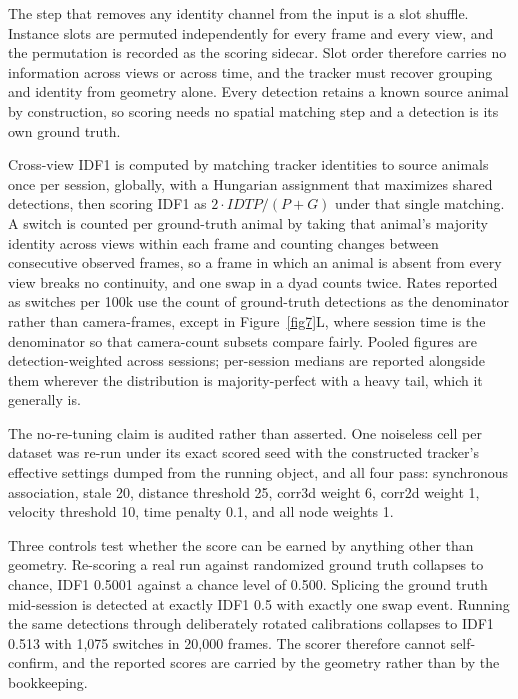 \documentclass[pdflatex, sn-nature]{sn-jnl}
\theoremstyle{thmstyleone}%
\theoremstyle{thmstyletwo}%
\theoremstyle{thmstylethree}%
\begin{document}
The step that removes any identity channel from the input is a slot shuffle. Instance slots are permuted independently for every frame and every view, and the permutation is recorded as the scoring sidecar. Slot order therefore carries no information across views or across time, and the tracker must recover grouping and identity from geometry alone. Every detection retains a known source animal by construction, so scoring needs no spatial matching step and a detection is its own ground truth.

Cross-view IDF1 is computed by matching tracker identities to source animals once per session, globally, with a Hungarian assignment that maximizes shared detections, then scoring IDF1 as $2 \cdot IDTP / (P + G)$ under that single matching. A switch is counted per ground-truth animal by taking that animal's majority identity across views within each frame and counting changes between consecutive observed frames, so a frame in which an animal is absent from every view breaks no continuity, and one swap in a dyad counts twice. Rates reported as switches per 100k use the count of ground-truth detections as the denominator rather than camera-frames, except in Figure~\ref{fig7}L, where session time is the denominator so that camera-count subsets compare fairly. Pooled figures are detection-weighted across sessions; per-session medians are reported alongside them wherever the distribution is majority-perfect with a heavy tail, which it generally is.

The no-re-tuning claim is audited rather than asserted. One noiseless cell per dataset was re-run under its exact scored seed with the constructed tracker's effective settings dumped from the running object, and all four pass: synchronous association, stale 20, distance threshold 25, corr3d weight 6, corr2d weight 1, velocity threshold 10, time penalty 0.1, and all node weights 1.

Three controls test whether the score can be earned by anything other than geometry. Re-scoring a real run against randomized ground truth collapses to chance, IDF1 0.5001 against a chance level of 0.500. Splicing the ground truth mid-session is detected at exactly IDF1 0.5 with exactly one swap event. Running the same detections through deliberately rotated calibrations collapses to IDF1 0.513 with 1,075 switches in 20,000 frames. The scorer therefore cannot self-confirm, and the reported scores are carried by the geometry rather than by the bookkeeping.
\end{document}
